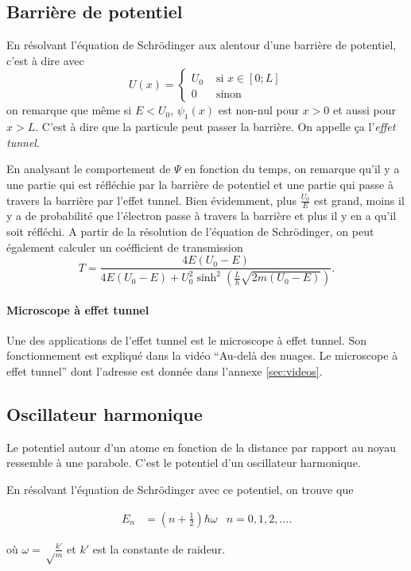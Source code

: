 \subsection{Barrière de potentiel}
En résolvant l'équation de Schrödinger
aux alentour d'une barrière de potentiel,
c'est à dire avec
\[ U(x) = \left\{
  \begin{aligned}
    U_0 & \text{ si } x \in [0; L]\\
    0 & \text{ sinon}
  \end{aligned}
\right. \]
on remarque que même si $E < U_0$,
$\psi_1(x)$ est non-nul pour $x > 0$ et aussi pour $x > L$.
C'est à dire que la particule peut passer la barrière.
On appelle ça l'\emph{effet tunnel}.

En analysant le comportement de $\Psi$ en fonction du temps,
on remarque qu'il y a
une partie qui est réfléchie par la barrière de potentiel et
une partie qui passe à travers la barrière par l'effet tunnel.
Bien évidemment, plus $\frac{U_0}{E}$ est grand,
moins il y a de probabilité que l'électron passe à travers la barrière
et plus il y en a qu'il soit réfléchi.
A partir de la résolution de l'équation de Schrödinger, on
peut également calculer un coéfficient de transmission
\[ T = \frac{4E(U_0-E)}{4E(U_0-E)+U_0^2\sinh^2(\frac{L}{h}\sqrt{2m(U_0-E)})}.\]

\paragraph{Microscope à effet tunnel}
Une des applications de l'effet tunnel est le
microscope à effet tunnel. Son fonctionnement est expliqué dans
la vidéo ``Au-delà des nuages. Le microscope à effet tunnel''
dont l'adresse est donnée dans l'annexe \ref{sec:videos}.

\subsection{Oscillateur harmonique}
Le potentiel autour d'un atome en fonction de la distance
par rapport au noyau ressemble à une parabole.
C'est le potentiel d'un oscillateur harmonique.

En résolvant l'équation de Schrödinger avec ce potentiel,
on trouve que

\begin{align*}
  E_n & = \left(n+\frac{1}{2}\right)\hbar\omega & n = 0, 1, 2, \ldots.
\end{align*}

où $\omega = \sqrt\frac{k'}{m}$ et
$k'$ est la constante de raideur.


